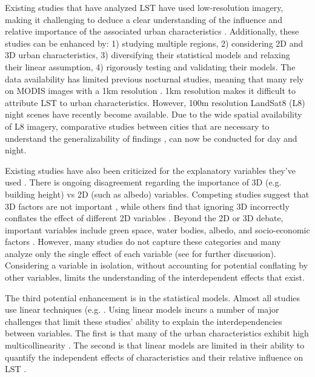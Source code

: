 \documentclass[final,3p,times,twocolumn,sort&compress]{elsarticle}
\begin{document}
Existing studies that have analyzed LST have used low-resolution imagery, making it challenging to deduce a clear understanding of the influence and relative importance of the associated urban characteristics \cite{Chun2017-mm, Echevarria_Icaza2016-fr, Wicki2017-fv, Zhou2014-wc}. 
Additionally, these studies can be enhanced by: 1) studying multiple regions, 2) considering 2D and 3D urban characteristics, 3) diversifying their statistical models and relaxing their linear assumption, 4) rigorously testing and validating their models.
The data availability has limited previous nocturnal studies, meaning that many rely on MODIS images with a 1km resolution \cite{Zhou2014-wc, Echevarria_Icaza2016-fr,Wang2019-tree,Peng2012-iy}.
1km resolution makes it difficult to attribute LST to urban characteristics.
However, 100m resolution LandSat8 (L8) night scenes have recently become available. 
Due to the wide spatial availability of L8 imagery, comparative studies between cities that are necessary to understand the generalizability of findings \cite{Peng2012-iy, Hung2006-qy}, can now be conducted for day and night.

Existing studies have also been criticized for the explanatory variables they've used \cite{Chun2017-mm,Peng2018-cp}.
There is ongoing disagreement regarding the importance of 3D (e.g. building height) vs 2D (such as albedo) variables.  
Competing studies suggest that 3D factors are not important \cite{Berger2017-lx}, while others find that ignoring 3D incorrectly conflates the effect of different 2D variables \cite{Chun2017-mm}.
Beyond the 2D or 3D debate, important variables include green space, water bodies, albedo, and socio-economic factors \cite{Peng2018-cp}. 
However, many studies do not capture these categories and many analyze only the single effect of each variable \cite{Zhao2017-cc, Merbitz2012-xz, Unger2004-ry} (see \cite{Peng2018-cp, Chun2017-mm} for further discussion). 
Considering a variable in isolation, without accounting for potential conflating by other variables, limits the understanding of the interdependent effects that exist.

The third potential enhancement is in the statistical models.
Almost all studies use linear techniques (e.g. \cite{Li2017-yl, Peng2012-iy, Wicki2017-fv,Zhou2014-wc,Peng2018-cp,Echevarria_Icaza2016-fr,Chun2017-mm,Chun2018-so,Wang2019-tree,Wang2019-water}.
Using linear models incurs a number of major challenges that limit these studies' ability to explain the interdependencies between variables. 
The first is that many of the urban characteristics exhibit high multicollinearity \cite{Zhou2014-wc}.
The second is that linear models are limited in their ability to quantify the independent effects of characteristics and their relative influence on LST \cite{Peng2018-cp, Zhou2014-wc}.
\end{document}
